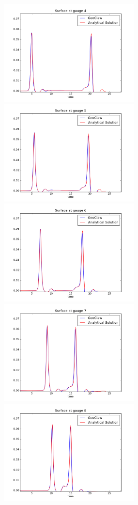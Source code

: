 \begin{figure}[ht]
\hfil\includegraphics[width=2.8in]{bp2/CaseB/gauge0004fig300.png}\hfil
\hfil\includegraphics[width=2.8in]{bp2/CaseB/gauge0005fig300.png}\hfil
\vskip 5pt
\hfil\includegraphics[width=2.8in]{bp2/CaseB/gauge0006fig300.png}\hfil
\hfil\includegraphics[width=2.8in]{bp2/CaseB/gauge0007fig300.png}\hfil
\vskip 5pt
\hfil\includegraphics[width=2.8in]{bp2/CaseB/gauge0008fig300.png}\hfil

\end{figure}

